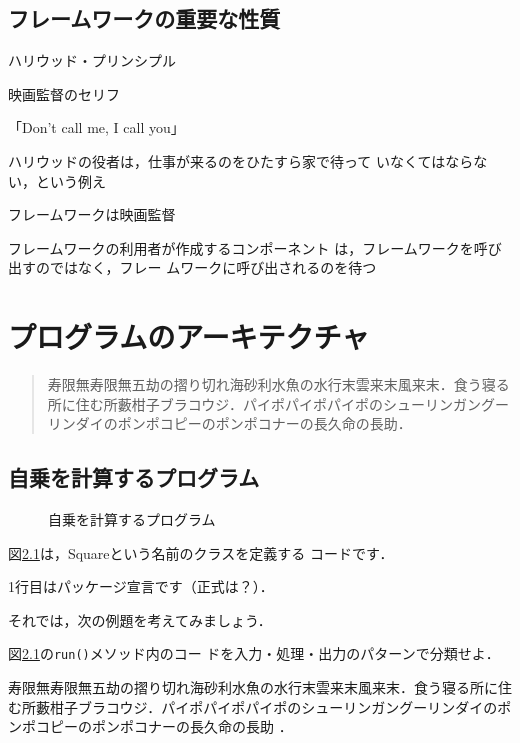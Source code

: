 \documentclass[a4j,papersize]{jsbook}
\begin{document}
\section{フレームワークの重要な性質}
ハリウッド・プリンシプル 

映画監督のセリフ 

「Don’t call me, I call you」 

 ハリウッドの役者は，仕事が来るのをひたすら家で待って
いなくてはならない，という例え 

フレームワークは映画監督 

フレームワークの利用者が作成するコンポーネント
は，フレームワークを呼び出すのではなく，フレー
ムワークに呼び出されるのを待つ 



\chapter{プログラムのアーキテクチャ}

\begin{abstract}
寿限無寿限無五劫の摺り切れ海砂利水魚の水行末雲来末風来末．食う寝る所に住む所藪柑子ブラコウジ．パイポパイポパイポのシューリンガングーリンダイのポンポコピーのポンポコナーの長久命の長助．
\end{abstract}

\section{自乗を計算するプログラム}
\begin{figure}

\caption{自乗を計算するプログラム}\label{code:Square1:square:Square}
\end{figure}

図\ref{code:Square1:square:Square}は，Squareという名前のクラスを定義する
コードです．

1行目はパッケージ宣言です（正式は？）．

それでは，次の例題を考えてみましょう．

\begin{例題}
 図\ref{code:Square1:square:Square}の\texttt{run()}メソッド内のコー
 ドを入力・処理・出力のパターンで分類せよ．
\end{例題}

寿限無寿限無五劫の摺り切れ海砂利水魚の水行末雲来末風来末．食う寝る所に住む所藪柑子ブラコウジ．パイポパイポパイポのシューリンガングーリンダイのポンポコピーのポンポコナーの長久命の長助
．
\end{document}
